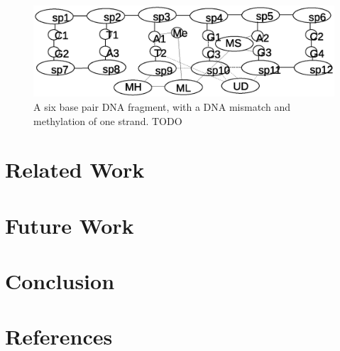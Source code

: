 \documentclass[review]{elsarticle}
\begin{document}
\begin{figure}[h!]
  \centering
    \includegraphics[width=1.0\textwidth]{mmr/state3}
  \caption[A six base pair DNA fragment.]{A six base pair DNA fragment, with a DNA mismatch and methylation of one strand. TODO}
  \label{fig:state3}
\end{figure}

\section{Related Work}

\section{Future Work}

\section{Conclusion}

\section*{References}


\end{document}
